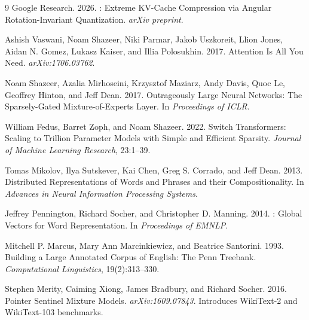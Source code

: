 \documentclass[10pt,twocolumn]{article}
\begin{document}
\begin{thebibliography}{9}
Google Research. 2026.
: Extreme {KV}-Cache Compression via Angular Rotation-Invariant Quantization.
\newblock \emph{arXiv preprint}.

Ashish Vaswani, Noam Shazeer, Niki Parmar, Jakob Uszkoreit, Llion Jones, Aidan N. Gomez, Lukasz Kaiser, and Illia Polosukhin. 2017.
\newblock Attention Is All You Need.
\newblock \emph{arXiv:1706.03762}.

Noam Shazeer, Azalia Mirhoseini, Krzysztof Maziarz, Andy Davis, Quoc Le, Geoffrey Hinton, and Jeff Dean. 2017.
\newblock Outrageously Large Neural Networks: The Sparsely-Gated Mixture-of-Experts Layer.
\newblock In \emph{Proceedings of ICLR}.

William Fedus, Barret Zoph, and Noam Shazeer. 2022.
\newblock Switch Transformers: Scaling to Trillion Parameter Models with Simple and Efficient Sparsity.
\newblock \emph{Journal of Machine Learning Research}, 23:1--39.

Tomas Mikolov, Ilya Sutskever, Kai Chen, Greg S. Corrado, and Jeff Dean. 2013.
\newblock Distributed Representations of Words and Phrases and their Compositionality.
\newblock In \emph{Advances in Neural Information Processing Systems}.

Jeffrey Pennington, Richard Socher, and Christopher D. Manning. 2014.
: Global Vectors for Word Representation.
\newblock In \emph{Proceedings of EMNLP}.

Mitchell P. Marcus, Mary Ann Marcinkiewicz, and Beatrice Santorini. 1993.
\newblock Building a Large Annotated Corpus of English: The Penn Treebank.
\newblock \emph{Computational Linguistics}, 19(2):313--330.

Stephen Merity, Caiming Xiong, James Bradbury, and Richard Socher. 2016.
\newblock Pointer Sentinel Mixture Models.
\newblock \emph{arXiv:1609.07843}. Introduces WikiText-2 and WikiText-103 benchmarks.
\end{thebibliography}
\end{document}
